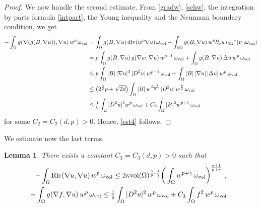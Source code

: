 \documentclass[10pt, a4paper, reqno, oneside]{amsart}
\theoremstyle{plain}
\theoremstyle{definition}
\theoremstyle{plain}
\newtheorem{lemma}[theo]{Lemma}
\theoremstyle{definition}
\theoremstyle{plain}
\renewcommand{\=}{:=}
\begin{document}
\begin{proof}
We now handle the second estimate. From \eqref{gradw}, \eqref{schw}, the integration by parts formula \eqref{intpart}, the Young inequality and the Neumann boundary condition, we get
$$\begin{aligned}
-\int_\Omega g(\nabla (g(B,\nabla u)), \nabla u)\,w^p\,\omega_{\mathrm{vol}} &= \int_\Omega g(B,\nabla u)\,{\rm div}(w^p \nabla u)\,\omega_{\mathrm{vol}} -\int_{\partial\Omega} g(B,\nabla u)\,w^p\partial_\nu u \, \imath_{\partial\Omega}{}^*(\nu \lrcorner \omega_{\mathrm{vol}}) \\
&= p\int_\Omega g(B,\nabla u)\,g(\nabla w,\nabla u)\,w^{p-1}\,\omega_{\mathrm{vol}} +\int_\Omega g(B,\nabla u)\,\Delta u\,w^p\,\omega_{\mathrm{vol}} \\
&\leq p\int_\Omega |B|\,|\nabla u|^3\,|D^2u|\,w^{p-1}\,\omega_{\mathrm{vol}} +\int_\Omega |B|\,|\nabla u|\,|\Delta u|\,w^p\,\omega_{\mathrm{vol}} \\
&\leq \big(2^{\frac32}p+\sqrt{2d}\big)\int_\Omega |B|\,w^{\frac{p+1}2}\,|D^2u|\,w^{\frac{p}2}\,\omega_{\mathrm{vol}} \\
&\leq \tfrac16 \int_\Omega |D^2u|^2w^p\,\omega_{\mathrm{vol}}+ C_2 \int_\Omega |B|^2w^{p+1}\,\omega_{\mathrm{vol}}
\end{aligned}$$
for some $C_2=C_2(d,p)>0$. Hence, \eqref{est4} follows.
\end{proof}

We estimate now the last terms.

\begin{lemma}
There exists a constant $C_3=C_3(d,p)>0$ such that
\begin{gather}
\label{est5}
-\int_\Omega \mathrm{Ric}(\nabla u,\nabla u)\,w^p\,\omega_{\mathrm{vol}} \leq
2\kappa {\rm vol}(\Omega)^{\frac{\gamma-1}{p+\gamma}} \bigg(\int_\Omega w^{p+\gamma}\,\omega_{\mathrm{vol}}\bigg)^{\frac{p+1}{p+\gamma}} \,\, , \\
\label{est6}
-\int_\Omega g(\nabla f,\nabla u)\,w^p\,\omega_{\mathrm{vol}} \leq \tfrac16\int_\Omega |D^2u|^2\,w^p\,\omega_{\mathrm{vol}} +C_3 \int_\Omega f^2\,w^p\,\omega_{\mathrm{vol}} \,\, . 
\end{gather}
\end{lemma}
\end{document}
